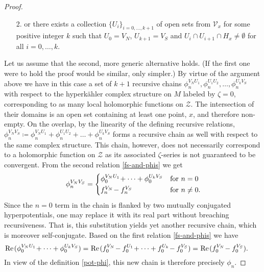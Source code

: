 \documentclass[11pt]{amsart}
\theoremstyle{remark}
\theoremstyle{remark}
\theoremstyle{definition}
\theoremstyle{definition}
\theoremstyle{definition}
\newcommand{\0}{{\scriptstyle 0'}} %
\newcommand{\1}{{\scriptstyle 1'}}
\newcommand{\pt}{\hspace{1pt}} %
\newcommand{\hp}{\hspace{0.5pt}} %
\renewcommand{\Re}{\hp\mbox{Re}\pt} %
\begin{document}
\begin{proof}
\begin{itemize}
\item[2.] or there exists a collection $\{U_i\}_{i=0,\dots,k+1}$ of open sets from $\mathscr{V}_x$ for some positive integer $k$ such that $U_0 = V_N$, $U_{k+1} = V_S$ and $U_i \cap U_{i+1} \cap H_x \neq \emptyset$ for all $i = 0,\dots,k$.
\end{itemize}
Let us assume that the second, more generic alternative holds. (If the first one were to hold the proof would be similar, only simpler.) By virtue of the argument above we have in this case a set of $k+1$ recursive chains $\phi^{V_NU_1}_n, \phi^{U_1U_2}_n, \dots, \phi^{U_{k}V_S}_n$ with respect to the hyperk\"ahler complex structure on $M$  labeled by $\zeta=0$, corresponding to as many local holomorphic functions on $\mathcal{Z}$. The intersection of their domains is an open set containing at least one point, $x$, and therefore non-empty. On the overlap, by the linearity of the defining recursive relations, $\phi^{V_NV_S}_n \!\coloneqq \phi^{V_NU_1}_n \!+ \phi^{U_1U_2}_n \!+ \dots + \phi^{U_kV_S}_n$ forms a recursive chain as well with respect to the same complex structure. This chain, however, does not necessarily correspond to a holomorphic function on $\mathcal{Z}$ as its associated \mbox{$\zeta$-series} is not guaranteed to be convergent. From the second relation \eqref{fs-and-phis} we get
\begin{equation}
\phi^{V_NV_S}_n =
\begin{cases}
\phi^{V_NU_1}_0 \!+ \dots + \phi^{U_kV_S}_0 & \text{for $n=0$} \\[1pt]
f^{V_N}_n \!- f^{V_S}_n & \text{for $n \neq 0$} \rlap{.}
\end{cases}
\end{equation}
Since the $n=0$ term in the chain is flanked by two mutually conjugated hyperpotentials, one may replace it with its real part without breaching recursiveness. That is, this substitution yields yet another recursive chain, which is moreover self-conjugate. Based on the first relation \eqref{fs-and-phis} we have
\begin{equation}
\Re (\phi^{V_NU_1}_0 \!+ \dots + \phi^{U_kV_S}_0) = \Re (f^{V_N}_0 \!- f^{U_1}_0 \!+ \dots + f^{U_k}_0 \!- f^{V_S}_0) = \Re(f^{V_N}_0 \!- f^{V_S}_0) \rlap{.} \qquad
\end{equation}
In view of the definition \eqref{pot-phi}, this new chain is therefore precisely $\phi_n$. 


\end{proof}
\end{document}
